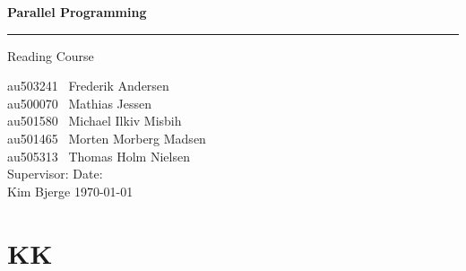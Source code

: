 \documentclass[12px,oz]{report}
\begin{document}
	

\thispagestyle{empty}
	\begin{titlepage}
		\centering
		\vspace*{3\baselineskip}
		{\Huge \bfseries Parallel Programming}
		\rule{\linewidth}{0.5mm}
		\LARGE
		Reading Course
		\\
		\null\vfill
		\begin{flushleft} \large
			au503241 \hspace*{2em} \  Frederik Andersen\\
			au500070 \hspace*{2em} \  Mathias Jessen\\
			au501580 \hspace*{2em} \  Michael Ilkiv Misbih\\
			au501465 \hspace*{2em} \  Morten Morberg Madsen\\
			au505313 \hspace*{2em} \  Thomas Holm Nielsen\\
			\vspace{100pt}
			Supervisor:\hspace{94pt}  Date: \\
			Kim Bjerge \hspace{90pt}  \today\\
		\end{flushleft}
		\vspace*{6\baselineskip}
	\end{titlepage}
	\thispagestyle{empty}
\clearpage
\setcounter{page}{1}

\chapter{KK}
\end{document}

